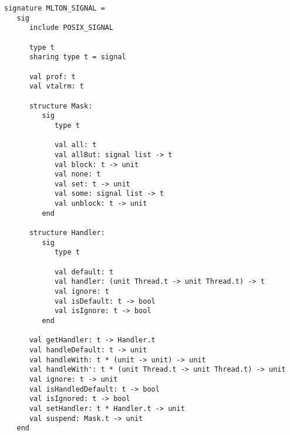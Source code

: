 \begin{verbatim}
signature MLTON_SIGNAL =
   sig
      include POSIX_SIGNAL

      type t
      sharing type t = signal

      val prof: t
      val vtalrm: t

      structure Mask:
         sig
            type t
               
            val all: t
            val allBut: signal list -> t
            val block: t -> unit
            val none: t
            val set: t -> unit
            val some: signal list -> t
            val unblock: t -> unit
         end

      structure Handler:
         sig
            type t

            val default: t
            val handler: (unit Thread.t -> unit Thread.t) -> t
            val ignore: t
            val isDefault: t -> bool
            val isIgnore: t -> bool
         end

      val getHandler: t -> Handler.t
      val handleDefault: t -> unit
      val handleWith: t * (unit -> unit) -> unit
      val handleWith': t * (unit Thread.t -> unit Thread.t) -> unit
      val ignore: t -> unit
      val isHandledDefault: t -> bool
      val isIgnored: t -> bool
      val setHandler: t * Handler.t -> unit
      val suspend: Mask.t -> unit
   end
\end{verbatim}

